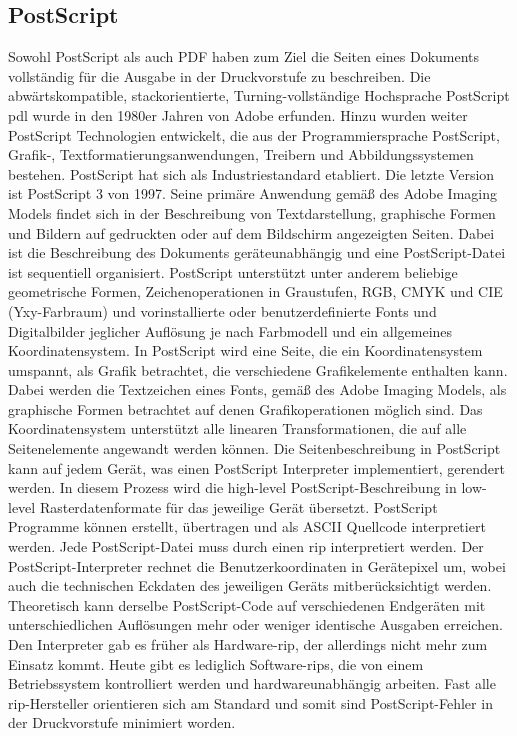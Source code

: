\subsection{PostScript}
Sowohl PostScript als auch PDF haben zum Ziel die Seiten eines Dokuments vollständig für die Ausgabe in der Druckvorstufe zu beschreiben. Die abwärtskompatible, stackorientierte, Turning-vollständige Hochsprache PostScript \gls{pdl} wurde in den 1980er Jahren von Adobe erfunden. \cite{adobe-postscript, wiki-postscript} Hinzu wurden weiter PostScript Technologien entwickelt, die aus der Programmiersprache PostScript, Grafik-, Textformatierungsanwendungen, Treibern und Abbildungssystemen bestehen. PostScript hat sich als Industriestandard etabliert. Die letzte Version ist PostScript 3 von 1997. Seine primäre Anwendung gemäß des Adobe Imaging Models findet sich in der Beschreibung von Textdarstellung, graphische Formen und Bildern auf gedruckten oder auf dem Bildschirm angezeigten Seiten. Dabei ist die Beschreibung des Dokuments geräteunabhängig und eine PostScript-Datei ist sequentiell organisiert. PostScript unterstützt unter anderem beliebige geometrische Formen, Zeichenoperationen in Graustufen, RGB, CMYK und CIE (Yxy-Farbraum) und  vorinstallierte oder benutzerdefinierte Fonts und Digitalbilder jeglicher Auflösung je nach Farbmodell und ein allgemeines Koordinatensystem.
In PostScript wird eine Seite, die ein Koordinatensystem umspannt, als Grafik betrachtet, die verschiedene Grafikelemente enthalten kann. Dabei werden die Textzeichen eines Fonts, gemäß des Adobe Imaging Models, als graphische Formen betrachtet auf denen Grafikoperationen möglich sind. Das Koordinatensystem unterstützt alle linearen Transformationen, die auf alle Seitenelemente angewandt werden können. Die Seitenbeschreibung in PostScript kann auf jedem Gerät, was einen PostScript Interpreter implementiert, gerendert werden. In diesem Prozess wird die high-level PostScript-Beschreibung in low-level Rasterdatenformate für das jeweilige Gerät übersetzt. PostScript Programme können erstellt, übertragen und als ASCII Quellcode interpretiert werden. \cite{adobe-postscript} Jede PostScript-Datei muss durch einen \gls{rip} interpretiert werden. Der PostScript-Interpreter rechnet die Benutzerkoordinaten in Gerätepixel um, wobei auch die technischen Eckdaten des jeweiligen Geräts mitberücksichtigt werden. Theoretisch kann derselbe PostScript-Code auf verschiedenen Endgeräten mit unterschiedlichen Auflösungen mehr oder weniger identische Ausgaben erreichen. Den Interpreter gab es früher als Hardware-\gls{rip}, der allerdings nicht mehr zum Einsatz kommt. Heute gibt es lediglich Software-\gls{rip}s, die von einem Betriebssystem kontrolliert werden und hardwareunabhängig arbeiten. Fast alle \gls{rip}-Hersteller orientieren sich am Standard und somit sind PostScript-Fehler in der Druckvorstufe minimiert worden. 
